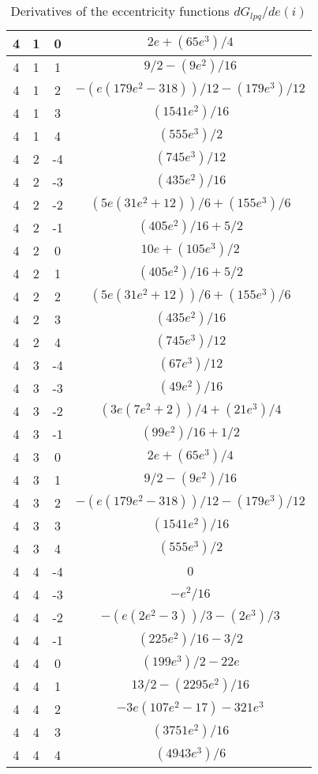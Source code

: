 \begin{table}
\begin{tabular}{|c|c|c|c|}
\hline
4  &  1  &  0  &  $2 e + (65 e^3)/4$  \\
\hline
4  &  1  &  1  &  $9/2 - (9 e^2)/16$  \\
\hline
4  &  1  &  2  &  $- (e (179 e^2 - 318))/12 - (179 e^3)/12$  \\
\hline
4  &  1  &  3  &  $(1541 e^2)/16$  \\
\hline
4  &  1  &  4  &  $(555 e^3)/2$  \\
\hline
4  &  2  &  -4  &  $(745 e^3)/12$  \\
\hline
4  &  2  &  -3  &  $(435 e^2)/16$  \\
\hline
4  &  2  &  -2  &  $(5 e (31 e^2 + 12))/6 + (155 e^3)/6$  \\
\hline
4  &  2  &  -1  &  $(405 e^2)/16 + 5/2$  \\
\hline
4  &  2  &  0  &  $10 e + (105 e^3)/2$  \\
\hline
4  &  2  &  1  &  $(405 e^2)/16 + 5/2$  \\
\hline
4  &  2  &  2  &  $(5 e (31 e^2 + 12))/6 + (155 e^3)/6$  \\
\hline
4  &  2  &  3  &  $(435 e^2)/16$  \\
\hline
4  &  2  &  4  &  $(745 e^3)/12$  \\
\hline
4  &  3  &  -4  &  $(67 e^3)/12$  \\
\hline
4  &  3  &  -3  &  $(49 e^2)/16$  \\
\hline
4  &  3  &  -2  &  $(3 e (7 e^2 + 2))/4 + (21 e^3)/4$  \\
\hline
4  &  3  &  -1  &  $(99 e^2)/16 + 1/2$  \\
\hline
4  &  3  &  0  &  $2 e + (65 e^3)/4$  \\
\hline
4  &  3  &  1  &  $9/2 - (9 e^2)/16$  \\
\hline
4  &  3  &  2  &  $- (e (179 e^2 - 318))/12 - (179 e^3)/12$  \\
\hline
4  &  3  &  3  &  $(1541 e^2)/16$  \\
\hline
4  &  3  &  4  &  $(555 e^3)/2$  \\
\hline
4  &  4  &  -4  &  $0$  \\
\hline
4  &  4  &  -3  &  $-e^2/16$  \\
\hline
4  &  4  &  -2  &  $- (e (2 e^2 - 3))/3 - (2 e^3)/3$  \\
\hline
4  &  4  &  -1  &  $(225 e^2)/16 - 3/2$  \\
\hline
4  &  4  &  0  &  $(199 e^3)/2 - 22 e$  \\
\hline
4  &  4  &  1  &  $13/2 - (2295 e^2)/16$  \\
\hline
4  &  4  &  2  &  $- 3 e (107 e^2 - 17) - 321 e^3$  \\
\hline
4  &  4  &  3  &  $(3751 e^2)/16$  \\
\hline
4  &  4  &  4  &  $(4943 e^3)/6$  \\
\hline
\end{tabular}
\caption{ Derivatives of the eccentricity functions $dG_{lpq}/de(i)$}
\label{table:table:dG}
\end{table}
